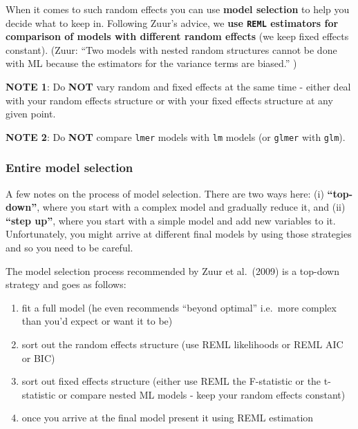 \documentclass[
]{article}
\providecommand{\tightlist}{%
  \setlength{\itemsep}{0pt}\setlength{\parskip}{0pt}}
\begin{document}
When it comes to such random effects you can use \textbf{model
selection} to help you decide what to keep in. Following Zuur's advice,
we \textbf{use \texttt{REML} estimators for comparison of models with
different random effects} (we keep fixed effects constant). (Zuur: ``Two
models with nested random structures cannot be done with ML because the
estimators for the variance terms are biased.'' )

\textbf{NOTE 1}: Do \textbf{NOT} vary random and fixed effects at the
same time - either deal with your random effects structure or with your
fixed effects structure at any given point.

\textbf{NOTE 2}: Do \textbf{NOT} compare \texttt{lmer} models with
\texttt{lm} models (or \texttt{glmer} with \texttt{glm}).

\subsubsection{Entire model selection}\label{entire-model-selection}

A few notes on the process of model selection. There are two ways here:
(i) \textbf{``top-down''}, where you start with a complex model and
gradually reduce it, and (ii) \textbf{``step up''}, where you start with
a simple model and add new variables to it. Unfortunately, you might
arrive at different final models by using those strategies and so you
need to be careful.

The model selection process recommended by Zuur et al.~(2009) is a
top-down strategy and goes as follows:

\begin{enumerate}
\def\labelenumi{\arabic{enumi}.}
\tightlist
\item
  fit a full model (he even recommends ``beyond optimal'' i.e.~more
  complex than you'd expect or want it to be)
\item
  sort out the random effects structure (use REML likelihoods or REML
  AIC or BIC)
\item
  sort out fixed effects structure (either use REML the F-statistic or
  the t-statistic or compare nested ML models - keep your random effects
  constant)
\item
  once you arrive at the final model present it using REML estimation
\end{enumerate}
\end{document}
